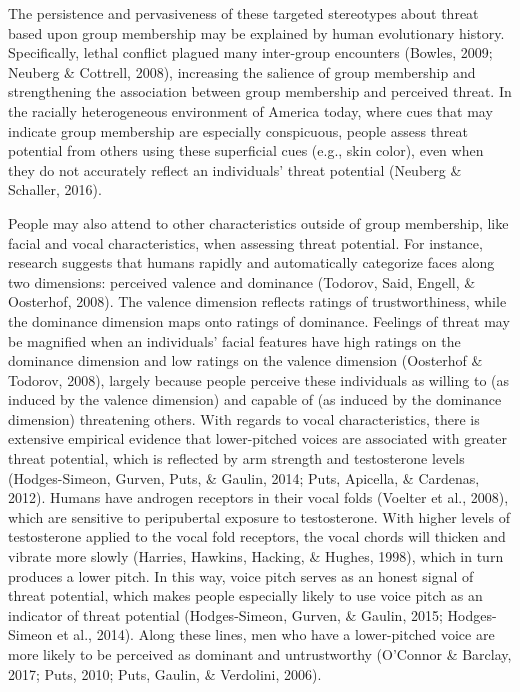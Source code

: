 \documentclass[
  english,
  man]{apa6}
\begin{document}
The persistence and pervasiveness of these targeted stereotypes about threat based upon group membership may be explained by human evolutionary history. Specifically, lethal conflict plagued many inter-group encounters (Bowles, 2009; Neuberg \& Cottrell, 2008), increasing the salience of group membership and strengthening the association between group membership and perceived threat. In the racially heterogeneous environment of America today, where cues that may indicate group membership are especially conspicuous, people assess threat potential from others using these superficial cues (e.g., skin color), even when they do not accurately reflect an individuals' threat potential (Neuberg \& Schaller, 2016).

People may also attend to other characteristics outside of group membership, like facial and vocal characteristics, when assessing threat potential. For instance, research suggests that humans rapidly and automatically categorize faces along two dimensions: perceived valence and dominance (Todorov, Said, Engell, \& Oosterhof, 2008). The valence dimension reflects ratings of trustworthiness, while the dominance dimension maps onto ratings of dominance. Feelings of threat may be magnified when an individuals' facial features have high ratings on the dominance dimension and low ratings on the valence dimension (Oosterhof \& Todorov, 2008), largely because people perceive these individuals as willing to (as induced by the valence dimension) and capable of (as induced by the dominance dimension) threatening others. With regards to vocal characteristics, there is extensive empirical evidence that lower-pitched voices are associated with greater threat potential, which is reflected by arm strength and testosterone levels (Hodges-Simeon, Gurven, Puts, \& Gaulin, 2014; Puts, Apicella, \& Cardenas, 2012). Humans have androgen receptors in their vocal folds (Voelter et al., 2008), which are sensitive to peripubertal exposure to testosterone. With higher levels of testosterone applied to the vocal fold receptors, the vocal chords will thicken and vibrate more slowly (Harries, Hawkins, Hacking, \& Hughes, 1998), which in turn produces a lower pitch. In this way, voice pitch serves as an honest signal of threat potential, which makes people especially likely to use voice pitch as an indicator of threat potential (Hodges-Simeon, Gurven, \& Gaulin, 2015; Hodges-Simeon et al., 2014). Along these lines, men who have a lower-pitched voice are more likely to be perceived as dominant and untrustworthy (O'Connor \& Barclay, 2017; Puts, 2010; Puts, Gaulin, \& Verdolini, 2006).
\end{document}
